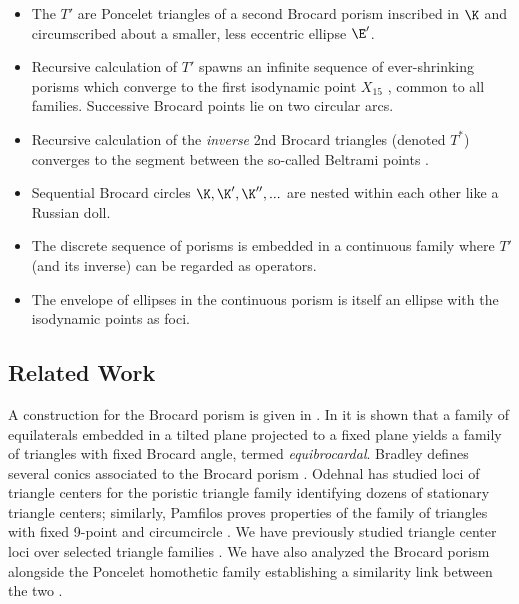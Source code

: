 \begin{itemize}
   \item The $T'$ are Poncelet triangles of a second Brocard porism inscribed in $\K$ and circumscribed about a smaller, less eccentric ellipse $\E'$.
   \item Recursive calculation of $T'$ spawns an infinite sequence of ever-shrinking porisms which converge to the first isodynamic point $X_{15}$ \cite[Isodynamic Points]{mw}, common to all families. Successive Brocard points lie on two circular arcs.
   \item Recursive calculation of the {\em inverse} 2nd Brocard triangles (denoted $T^*$) converges to the segment between the so-called Beltrami points \cite{etc-bicentric}. 
   \item Sequential Brocard circles $\K,\K',\K'',...$ are nested within each other like a Russian doll.
   \item The discrete sequence of porisms is embedded in a continuous family where $T'$ (and its inverse) can be regarded as operators.
   \item The envelope of ellipses in the continuous porism is itself an ellipse with the isodynamic points as foci.
\end{itemize}


\subsection*{Related Work}

 A construction for the Brocard porism is given in \cite[Theorem 4.20, p. 129]{akopyan2007-conics}. In \cite[chapt XVII]{johnson1960} it is shown that a family of equilaterals embedded in a tilted plane projected to a fixed plane yields a  family of triangles with fixed Brocard angle, termed {\em equibrocardal}.
Bradley defines several conics associated to the Brocard porism \cite{bradley2011-brocard}. Odehnal has studied loci of triangle centers for the poristic triangle family \cite{odehnal2011-poristic} identifying dozens of stationary triangle centers; similarly, Pamfilos proves properties of the family of triangles with fixed 9-point and circumcircle \cite{pamfilos2020}.  We have previously studied triangle center loci over selected triangle families \cite{garcia2020-brocard,reznik2020-intelligencer}. We have also analyzed the Brocard porism alongside the Poncelet homothetic family establishing a similarity link between the two \cite{reznik2020-similarityII}.

